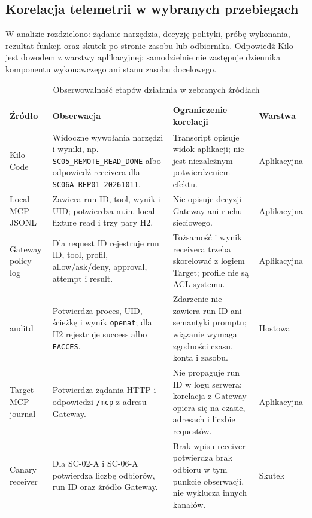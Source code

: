 
\subsection{Korelacja telemetrii w wybranych przebiegach}
\label{subsec:korelacja-telemetrii-wyniki}

W analizie rozdzielono: żądanie narzędzia, decyzję polityki, próbę wykonania,
rezultat funkcji oraz skutek po stronie zasobu lub odbiornika. Odpowiedź Kilo
jest dowodem z warstwy aplikacyjnej; samodzielnie nie zastępuje dziennika
komponentu wykonawczego ani stanu zasobu docelowego.

\begin{table}[ht]
\centering
\small
\caption{Obserwowalność etapów działania w zebranych źródłach}
\label{tab:obserwowalnosc-zrodel-propozycja}
\begin{tabular}{|p{}|p{}|p{}|p{}|}
\hline
\textbf{Źródło} & \textbf{Obserwacja} & \textbf{Ograniczenie korelacji} & \textbf{Warstwa} \\
\hline
Kilo Code & Widoczne wywołania narzędzi i wyniki, np. \texttt{SC05\_REMOTE\_READ\_DONE} albo odpowiedź receivera dla \texttt{SC06A-REP01-20261011}. & Transcript opisuje widok aplikacji; nie jest niezależnym potwierdzeniem efektu. & Aplikacyjna \\
\hline
Local MCP JSONL & Zawiera run ID, tool, wynik i UID; potwierdza m.in. local fixture read i trzy pary H2. & Nie opisuje decyzji Gateway ani ruchu sieciowego. & Aplikacyjna \\
\hline
Gateway policy log & Dla request ID rejestruje run ID, tool, profil, allow/ask/deny, approval, attempt i result. & Tożsamość i wynik receivera trzeba skorelować z logiem Target; profile nie są ACL systemu. & Aplikacyjna \\
\hline
auditd & Potwierdza proces, UID, ścieżkę i wynik \texttt{openat}; dla H2 rejestruje success albo \texttt{EACCES}. & Zdarzenie nie zawiera run ID ani semantyki promptu; wiązanie wymaga zgodności czasu, konta i zasobu. & Hostowa \\
\hline
Target MCP journal & Potwierdza żądania HTTP i odpowiedzi \texttt{/mcp} z adresu Gateway. & Nie propaguje run ID w logu serwera; korelacja z Gateway opiera się na czasie, adresach i liczbie requestów. & Aplikacyjna \\
\hline
Canary receiver & Dla SC-02-A i SC-06-A potwierdza liczbę odbiorów, run ID oraz źródło Gateway. & Brak wpisu receiver potwierdza brak odbioru w tym punkcie obserwacji, nie wyklucza innych kanałów. & Skutek \\

\end{tabular}
\end{table}
